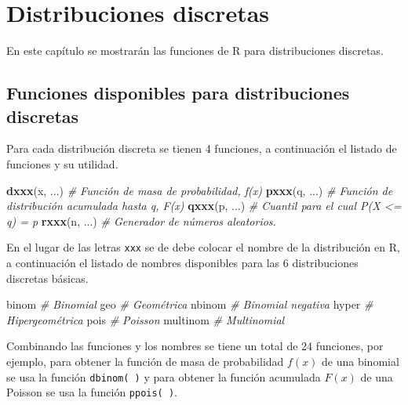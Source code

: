 \documentclass[10pt,]{krantz}
\makeatletter
\newenvironment{Shaded}{\begin{snugshade}}{\end{snugshade}}
\newcommand{\KeywordTok}[1]{\textcolor[rgb]{0.13,0.29,0.53}{\textbf{#1}}}
\newcommand{\CommentTok}[1]{\textcolor[rgb]{0.56,0.35,0.01}{\textit{#1}}}
\newcommand{\NormalTok}[1]{#1}
\let\proglang=\textsf
\newenvironment{kframe}{%
\medskip{}
\setlength{\fboxsep}{.8em}
 \def\at@end@of@kframe{}%
 \ifinner\ifhmode%
  \def\at@end@of@kframe{\end{minipage}}%
  \begin{minipage}{\columnwidth}%
 \fi\fi%
 \def\FrameCommand##1{\hskip\@totalleftmargin \hskip-\fboxsep
 \colorbox{shadecolor}{##1}\hskip-\fboxsep
     \hskip-\linewidth \hskip-\@totalleftmargin \hskip\columnwidth}%
 \MakeFramed {\advance\hsize-\width
   \@totalleftmargin\z@ \linewidth\hsize
   \@setminipage}}%
 {\par\unskip\endMakeFramed%
 \at@end@of@kframe}
\renewenvironment{Shaded}{\begin{kframe}}{\end{kframe}}
\makeatother
\begin{document}
\chapter{\texorpdfstring{Distribuciones discretas
\label{discretas}}{Distribuciones discretas }}\label{distribuciones-discretas}

En este capítulo se mostrarán las funciones de \proglang{R} para
distribuciones discretas.

\section{\texorpdfstring{Funciones disponibles para distribuciones
discretas
}{Funciones disponibles para distribuciones discretas }}\label{funciones-disponibles-para-distribuciones-discretas}

Para cada distribución discreta se tienen 4 funciones, a continuación el
listado de funciones y su utilidad.

\begin{Shaded}
\begin{Highlighting}[]
\KeywordTok{dxxx}\NormalTok{(x, ...)  }\CommentTok{# Función de masa de probabilidad, f(x)}
\KeywordTok{pxxx}\NormalTok{(q, ...)  }\CommentTok{# Función de distribución acumulada hasta q, F(x)}
\KeywordTok{qxxx}\NormalTok{(p, ...)  }\CommentTok{# Cuantil para el cual P(X <= q) = p}
\KeywordTok{rxxx}\NormalTok{(n, ...)  }\CommentTok{# Generador de números aleatorios.}
\end{Highlighting}
\end{Shaded}

En el lugar de las letras \texttt{xxx} se de debe colocar el nombre de
la distribución en \proglang{R}, a continuación el listado de nombres
disponibles para las 6 distribuciones discretas básicas.

\begin{Shaded}
\begin{Highlighting}[]
\NormalTok{binom     }\CommentTok{# Binomial}
\NormalTok{geo       }\CommentTok{# Geométrica}
\NormalTok{nbinom    }\CommentTok{# Binomial negativa}
\NormalTok{hyper     }\CommentTok{# Hipergeométrica}
\NormalTok{pois      }\CommentTok{# Poisson}
\NormalTok{multinom  }\CommentTok{# Multinomial}
\end{Highlighting}
\end{Shaded}

Combinando las funciones y los nombres se tiene un total de 24
funciones, por ejemplo, para obtener la función de masa de probabilidad
\(f(x)\) de una binomial se usa la función \texttt{dbinom(\ )} y para
obtener la función acumulada \(F(x)\) de una Poisson se usa la función
\texttt{ppois(\ )}.
\end{document}
